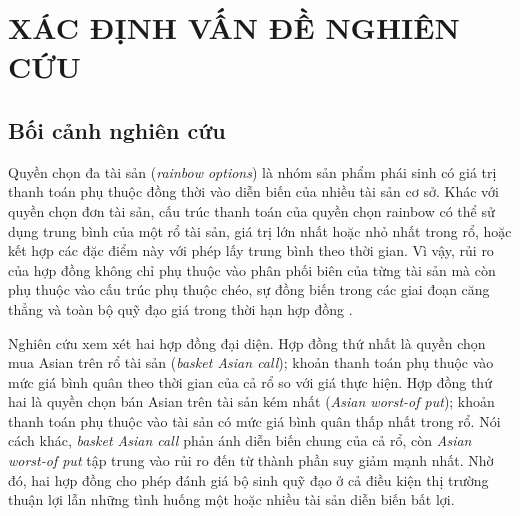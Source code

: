 
\chapter{XÁC ĐỊNH VẤN ĐỀ NGHIÊN CỨU}
\label{chap:xac-dinh-van-de}

\section{Bối cảnh nghiên cứu}
\label{sec:boi-canh-nghien-cuu}

Quyền chọn đa tài sản (\textit{rainbow options}) là nhóm sản phẩm phái sinh có
giá trị thanh toán phụ thuộc đồng thời vào diễn biến của nhiều tài sản cơ sở.
Khác với quyền chọn đơn tài sản, cấu trúc thanh toán của quyền chọn rainbow có
thể sử dụng trung bình của một rổ tài sản, giá trị lớn nhất hoặc nhỏ nhất trong
rổ, hoặc kết hợp các đặc điểm này với phép lấy trung bình theo thời gian. Vì
vậy, rủi ro của hợp đồng không chỉ phụ thuộc vào phân phối biên của từng tài
sản mà còn phụ thuộc vào cấu trúc phụ thuộc chéo, sự đồng biến trong các giai
đoạn căng thẳng và toàn bộ quỹ đạo giá trong thời hạn hợp đồng
\parencite{Johnson1987,Wystup2006}.

Nghiên cứu xem xét hai hợp đồng đại diện. Hợp đồng thứ nhất là quyền chọn mua
Asian trên rổ tài sản (\textit{basket Asian call}); khoản thanh toán phụ thuộc
vào mức giá bình quân theo thời gian của cả rổ so với giá thực hiện. Hợp đồng
thứ hai là quyền chọn bán Asian trên tài sản kém nhất
(\textit{Asian worst-of put}); khoản thanh toán phụ thuộc vào tài sản có mức
giá bình quân thấp nhất trong rổ. Nói cách khác, \textit{basket Asian call}
phản ánh diễn biến chung của cả rổ, còn \textit{Asian worst-of put} tập trung
vào rủi ro đến từ thành phần suy giảm mạnh nhất. Nhờ đó, hai hợp đồng cho phép
đánh giá bộ sinh quỹ đạo ở cả điều kiện thị trường thuận lợi lẫn những tình
huống một hoặc nhiều tài sản diễn biến bất lợi.

